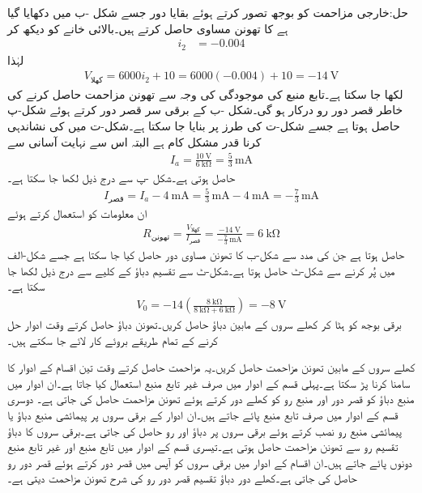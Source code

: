 حل:خارجی  مزاحمت کو بوجھ تصور کرتے ہوئے بقایا دور جسے شکل -ب میں دکھایا گیا ہے کا تھونن مساوی حاصل کرتے ہیں۔بالائی خانے کو دیکھ کر
\begin{align*}
i_2&=-0.004
\end{align*}
لہٰذا
\begin{align*}
V_{\text{کھلا}}=6000 i_2+10= 6000(-0.004)+10=\SI{-14}{\volt}
\end{align*}
لکھا جا سکتا ہے۔تابع منبع کی موجودگی کی  وجہ سے  تھونن مزاحمت حاصل کرنے کی خاطر قصر دور رو درکار ہو گی۔شکل -ب کے برقی سر قصر دور کرتے ہوئے  شکل-پ حاصل ہوتا ہے جسے شکل-ت کی طرز پر بنایا جا سکتا ہے۔شکل-ت میں  کی نشاندہی کرنا قدر مشکل کام ہے البتہ اس سے  نہایت آسانی سے
\begin{align*}
I_a=\frac{\SI{10}{\volt}}{\SI{6}{\kilo\ohm}}=\frac{5}{3}\, \si{\milli\ampere}
\end{align*}
 حاصل ہوتی ہے۔شکل -پ سے درج ذیل لکھا جا سکتا ہے۔
\begin{align*}
I_{\text{قصر}}=I_a-\SI{4}{\milli\ampere}=\frac{5}{3}\, \si{\milli\ampere}-\SI{4}{\milli\ampere}=-\frac{7}{3}\, \si{\milli\ampere}
\end{align*}
ان معلومات کو استعمال کرتے ہوئے
\begin{align*}
R_{\text{تھونن}}=\frac{V_{\text{کھلا}}}{I_{\text{قصر}}}=\frac{\SI{-14}{\volt}}{-\frac{7}{3}\,\si{\milli\ampere}}=\SI{6}{\kilo\ohm}
\end{align*}
حاصل ہوتا ہے جن کی مدد سے شکل-ب کا تھونن مساوی دور حاصل کیا جا سکتا ہے جسے شکل-الف میں پُر کرنے سے شکل-ٹ حاصل ہوتا ہے۔شکل-ٹ سے تقسیم دباؤ کے کلیے سے درج ذیل لکھا جا سکتا ہے۔
\begin{align*}
V_0=-14 \left(\frac{\SI{8}{\kilo\ohm}}{\SI{8}{\kilo\ohm}+\SI{6}{\kilo\ohm}}\right)=\SI{-8}{\volt}
\end{align*}
برقی بوجھ کو ہٹا کر کھلے سروں کے مابین  دباؤ  حاصل کریں۔تھونن دباؤ حاصل کرتے وقت ادوار حل کرنے کے تمام طریقے بروئے کار لائے جا سکتے ہیں۔

کھلے سروں کے مابین تھونن مزاحمت حاصل کریں۔یہ مزاحمت حاصل کرتے وقت تین اقسام کے ادوار کا سامنا کرنا پڑ سکتا ہے۔پہلی قسم  کے ادوار میں صرف غیر تابع منبع استعمال کیا جاتا ہے۔ان ادوار میں منبع دباؤ کو قصر دور اور منبع رو کو کھلے دور کرتے ہوئے  تھونن مزاحمت حاصل کی جاتی ہے۔ دوسری قسم کے ادوار میں صرف تابع منبع پائے جاتے ہیں۔ان ادوار کے برقی سروں پر پیمائشی منبع دباؤ یا پیمائشی منبع رو نصب کرتے ہوئے برقی سروں پر دباؤ اور رو حاصل کی جاتی ہے۔برقی سروں کا دباؤ تقسیم رو سے تھونن مزاحمت حاصل ہوتی ہے۔تیسری قسم کے ادوار میں تابع منبع اور غیر تابع منبع دونوں پائے جاتے ہیں۔ان اقسام کے ادوار میں برقی سروں کو آپس میں قصر دور کرتے ہوئے قصر دور رو حاصل کی جاتی ہے۔کھلے دور دباؤ تقسیم قصر دور رو کی شرح تھونن مزاحمت دیتی ہے۔


